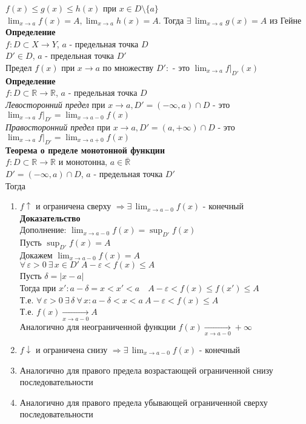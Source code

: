 \documentclass[12pt]{article}
\begin{document}
$f(x) \leq g(x) \leq h(x)$ при $x \in D \setminus\{a\}$\\
$\lim_{x\rightarrow a} f(x) = A, \lim_{x\rightarrow a} h(x) = A$. Тогда $\exists\,\lim_{x\rightarrow a} g(x) = A$ из Гейне\\
\textbf{Определение}\\
$f: D\subset X \rightarrow Y$, $a$ - предельная точка $D$\\
$D'\in D$, $a$ - предельная точка $D'$\\
Предел $f(x)$ при $x\rightarrow a$ по множеству $D':$ - это $\lim_{x\rightarrow a} f|_{D'}(x)$\\
\textbf{Определение}\\
$f:D\subset\mathbb{R} \rightarrow \mathbb{R}$, $a$ - предельная точка $D$\\
\textit{Левосторонний предел} при $x\rightarrow a, D' = (-\infty, a) \cap D$ - это\\
$\lim_{x\rightarrow a} f|_{D'} = \lim_{x\rightarrow a-0} f(x)$\\
\textit{Правосторонний предел} при $x\rightarrow a, D' = (a, +\infty) \cap D$ - это\\
$\lim_{x\rightarrow a} f|_{D'} = \lim_{x\rightarrow a+0} f(x)$\\
\textbf{Теорема о пределе монотонной функции}\\
$f:D\subset \mathbb{R} \rightarrow \mathbb{R}$ и монотонна, $a\in \overline{\mathbb{R}}$\\
$D'=(-\infty,a)\cap D$, $a$ - предельная точка $D'$\\
Тогда
\begin{enumerate}
    \item $f\uparrow$ и ограничена сверху $\Rightarrow\exists\,\lim_{x\rightarrow a-0} f(x)$ - конечный\\
    \textbf{Доказательство}\\
    Дополнение: $\lim_{x\rightarrow a-0}f(x) = \sup_{D'} f(x)$\\
    Пусть $\sup_{D'} f(x) = A$\\
    Докажем $\lim_{x\rightarrow a-0}f(x) = A$\\
    $\forall\, \varepsilon > 0\ \exists\,x\in D'\ A-\varepsilon<f(x)\leq A$\\
    Пусть $\delta = |x-a|$\\
    Тогда при $x':a-\delta =x < x' < a\quad A-\varepsilon < f(x) \leq f(x') \leq A$\\
    Т.е. $\forall\,\varepsilon > 0\ \exists\,\delta\ \forall\,x:a-\delta < x < a\ A-\varepsilon<f(x)\leq A$\\
    Т.е. $f(x) \xrightarrow[x\rightarrow a-0]{} A$\\
    Аналогично для неограниченной функции $f(x) \xrightarrow[x\rightarrow a-0]{} +\infty$
    \item $f\downarrow$ и ограничена снизу $\Rightarrow\exists\,\lim_{x\rightarrow a-0} f(x)$ - конечный
    \item Аналогично для правого предела возрастающей ограниченной снизу последовательности
    \item Аналогично для правого предела убывающей ограниченной сверху последовательности
\end{enumerate}
\end{document}
